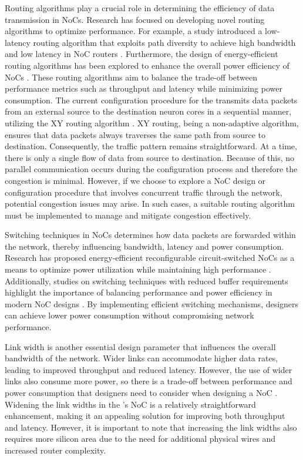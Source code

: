 Routing algorithms play a crucial role in determining the efficiency of data transmission in NoCs.
Research has focused on developing novel routing algorithms to optimize performance.
For example, a study introduced a low-latency routing algorithm that exploits path diversity to achieve high bandwidth and low latency in NoC routers \cite{yangExploitingPathDiversity2012}.
Furthermore, the design of energy-efficient routing algorithms has been explored to enhance the overall power efficiency of NoCs \cite{parikhPowerAwareNoCsRouting2014}.
These routing algorithms aim to balance the trade-off between performance metrics such as throughput and latency while minimizing power consumption.
The current configuration procedure for the \graicore{} transmits data packets from an external source to the destination neuron cores in a sequential manner, utilizing the XY routing algorithm \cite{glassTurnModelAdaptive1992}.
XY routing, being a non-adaptive algorithm, ensures that data packets always traverses the same path from source to destination.
Consequently, the traffic pattern remains straightforward.
At a time, there is only a single flow of data from source to destination.
Because of this, no parallel communication occurs during the configuration process and therefore the congestion is minimal.
However, if we choose to explore a NoC design or configuration procedure that involves concurrent traffic through the network, potential congestion issues may arise.
In such cases, a suitable routing algorithm must be implemented to manage and mitigate congestion effectively.

Switching techniques in NoCs determines how data packets are forwarded within the network, thereby influencing bandwidth, latency and power consumption.
Research has proposed energy-efficient reconfigurable circuit-switched NoCs as a means to optimize power utilization while maintaining high performance \cite{wolkotteEnergyEfficientReconfigurableCircuitSwitched2005}.
Additionally, studies on switching techniques with reduced buffer requirements highlight the importance of balancing performance and power efficiency in modern NoC designs \cite{requenaEfficientSwitchingTechnique2008}.
By implementing efficient switching mechanisms, designers can achieve lower power consumption without compromising network performance.

Link width is another essential design parameter that influences the overall bandwidth of the network.
Wider links can accommodate higher data rates, leading to improved throughput and reduced latency.
However, the use of wider links also consume more power, so there is a trade-off between performance and power consumption that designers need to consider when designing a NoC \cite{manhokimNetworkonchipLinkAnalysis2006}.
Widening the link widths in the \graicore{}'s NoC is a relatively straightforward enhancement, making it an appealing solution for improving both throughput and latency.
However, it is important to note that increasing the link widths also requires more silicon area due to the need for additional physical wires and increased router complexity.

